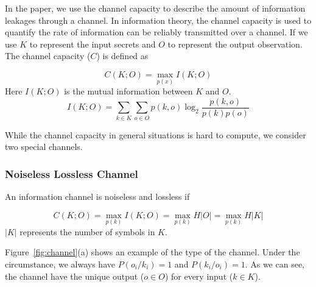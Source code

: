 In the paper, we use the channel capacity to describe the amount of information leakages through a channel. In information theory, the channel capacity is used to quantify the rate of information can be reliably transmitted over a channel. If we use $K$ to represent the input secrets and $O$ to represent the output observation. The channel capacity ($C$) is defined as

\begin{equation}\label{chapter5:eq2}
  C(K;O) = \max_{p(x)} I(K;O)
\end{equation}
Here $I(K;O)$ is the mutual information between $K$ and $O$.
\begin{equation} \label{chapter5:eq3}
  I(K;O) = \sum_{k {\in} K}{\sum_{o {\in} O}{p(k, o)\log_2\frac{p(k, o)}{p(k)p(o)}}}
\end{equation}

While the channel capacity in general situations is hard to compute, we consider two special channels.

\subsubsection{Noiseless Lossless Channel}
An information channel is noiseless and lossless if

\begin{equation} \label{chapter5:eq4}
  C(K;O) = \max_{p(k)} I(K;O) = \max_{p(k)} H|O| =\max_{p(k)} H|K|
\end{equation}
$|K|$ represents the number of symbols in $K$.

Figure~\ref{fig:channel}(a) shows an example of the type of the channel. Under the circumstance, we always have $P(o_i/k_i) = 1$ and $P(k_i/o_i) = 1$. As we can see, the channel have the unique output ($o \in O$) for every input ($k \in K$).

